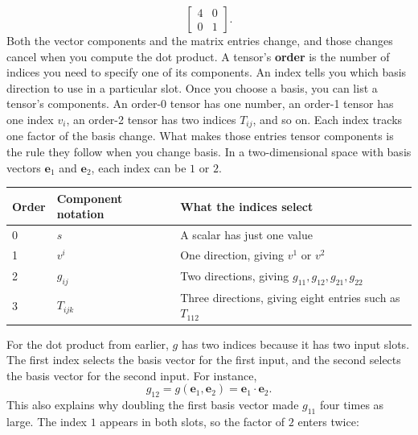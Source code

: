 \documentclass{report}
\begin{document}
\begin{itemize}
            \[
                \begin{bmatrix}4&0\\0&1\end{bmatrix}.
            \]
            Both the vector components and the matrix entries change, and those changes cancel when you compute the dot product.
            \bigbreak \noindent 
            A tensor’s \textbf{order} is the number of indices you need to specify one of its components. An index tells you which basis direction to use in a particular slot.
            \bigbreak \noindent 
            Once you choose a basis, you can list a tensor’s components. An order-0 tensor has one number, an order-1 tensor has one index \(v_i\), an order-2 tensor has two indices \(T_{ij}\), and so on. Each index tracks one factor of the basis change. What makes those entries tensor components is the rule they follow when you change basis.
            \bigbreak \noindent 
            In a two-dimensional space with basis vectors \(\mathbf e_1\) and \(\mathbf e_2\), each index can be \(1\) or \(2\).
            \begin{center}
                \begin{tabularx}{\textwidth}{@{}lXX@{}}
                    \toprule
                    \textbf{Order}&  \textbf{Component notation}&  \textbf{What the indices select} \\
                    \midrule
                    0  &\(s\)  &A scalar has just one value \\[2ex]
                    1  &\(v^i\)  &One direction, giving \(v^1\) or \(v^2\) \\[2ex]
                    2  &\(g_{ij}\) & Two directions, giving \(g_{11}, g_{12}, g_{21}, g_{22}\) \\[2ex]
                    3  &\(T_{ijk}\)&  Three directions, giving eight entries such as \(T_{112}\) \\
                    \bottomrule
                \end{tabularx}
            \end{center}
            For the dot product from earlier, \(g\) has two indices because it has two input slots. The first index selects the basis vector for the first input, and the second selects the basis vector for the second input. For instance,
            \[
                g_{12}=g(\mathbf e_1,\mathbf e_2)=\mathbf e_1\cdot\mathbf e_2.
            \]
            This also explains why doubling the first basis vector made \(g_{11}\) four times as large. The index \(1\) appears in both slots, so the factor of \(2\) enters twice:

\end{itemize}
\end{document}
